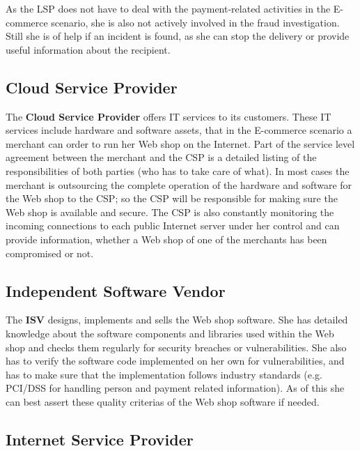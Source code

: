 As the \gls{LSP} does not have to deal with the payment-related activities in the E-commerce scenario, she is also not actively involved in the fraud investigation. Still she is of help if an incident is found, as she can stop the delivery or provide useful information about the recipient.


\subsection{Cloud Service Provider}
\label{subsec:stakeholder_csp}

The \textbf{Cloud Service Provider} offers IT services to its customers. These IT services include hardware and software assets, that in the E-commerce scenario a merchant can order to run her Web shop on the Internet. Part of the service level agreement between the merchant and the \gls{CSP} is a detailed listing of the responsibilities of both parties (who has to take care of what). In most cases the merchant is outsourcing the complete operation of the hardware and software for the Web shop to the \gls{CSP}; so the \gls{CSP} will be responsible for making sure the Web shop is available and secure. The \gls{CSP} is also constantly monitoring the incoming connections to each public Internet server under her control and can provide information, whether a Web shop of one of the merchants has been compromised or not.


\subsection{Independent Software Vendor}
\label{subsec:stakeholder_isv}

The \textbf{ISV} designs, implements and sells the Web shop software. She has detailed knowledge about the software components and libraries used within the Web shop and checks them regularly for security breaches or vulnerabilities. She also has to verify the software code implemented on her own for vulnerabilities, and has to make sure that the implementation follows industry standards (e.g. PCI/DSS for handling person and payment related information). As of this she can best assert these quality criterias of the Web shop software if needed.


\subsection{Internet Service Provider}
\label{subsec:stakeholder_isp}

